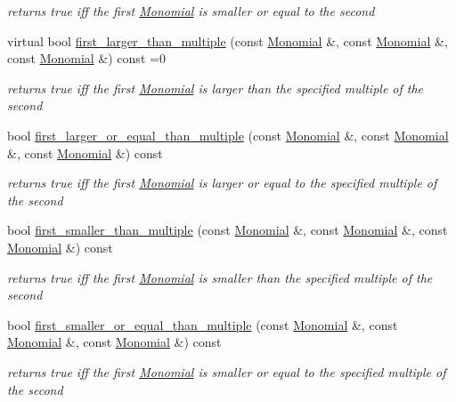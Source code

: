 \begin{Indent}
\begin{DoxyCompactItemize}
\begin{DoxyCompactList}\small\item\em returns {\ttfamily true} iff the first \hyperlink{class_monomial}{Monomial} is smaller or equal to the second \end{DoxyCompactList}\item 
\mbox{\label{class_monomial___ordering_aacb0439b908d45cc5f2635567c6633fd}} 
virtual bool \hyperlink{class_monomial___ordering_aacb0439b908d45cc5f2635567c6633fd}{first\+\_\+larger\+\_\+than\+\_\+multiple} (const \hyperlink{class_monomial}{Monomial} \&, const \hyperlink{class_monomial}{Monomial} \&, const \hyperlink{class_monomial}{Monomial} \&) const =0
\begin{DoxyCompactList}\small\item\em returns {\ttfamily true} iff the first \hyperlink{class_monomial}{Monomial} is larger than the specified multiple of the second \end{DoxyCompactList}\item 
bool \hyperlink{class_monomial___ordering_ad4af4c79cf46666222fe30fdd4ceb45e}{first\+\_\+larger\+\_\+or\+\_\+equal\+\_\+than\+\_\+multiple} (const \hyperlink{class_monomial}{Monomial} \&, const \hyperlink{class_monomial}{Monomial} \&, const \hyperlink{class_monomial}{Monomial} \&) const
\begin{DoxyCompactList}\small\item\em returns {\ttfamily true} iff the first \hyperlink{class_monomial}{Monomial} is larger or equal to the specified multiple of the second \end{DoxyCompactList}\item 
bool \hyperlink{class_monomial___ordering_aad1ca67ca89fa85e63475d24d9f0a987}{first\+\_\+smaller\+\_\+than\+\_\+multiple} (const \hyperlink{class_monomial}{Monomial} \&, const \hyperlink{class_monomial}{Monomial} \&, const \hyperlink{class_monomial}{Monomial} \&) const
\begin{DoxyCompactList}\small\item\em returns {\ttfamily true} iff the first \hyperlink{class_monomial}{Monomial} is smaller than the specified multiple of the second \end{DoxyCompactList}\item 
bool \hyperlink{class_monomial___ordering_a0ed5bf2b1da5daaa67aaba00f8c6cbd0}{first\+\_\+smaller\+\_\+or\+\_\+equal\+\_\+than\+\_\+multiple} (const \hyperlink{class_monomial}{Monomial} \&, const \hyperlink{class_monomial}{Monomial} \&, const \hyperlink{class_monomial}{Monomial} \&) const
\begin{DoxyCompactList}\small\item\em returns {\ttfamily true} iff the first \hyperlink{class_monomial}{Monomial} is smaller or equal to the specified multiple of the second \end{DoxyCompactList}\end{DoxyCompactItemize}
\end{Indent}


